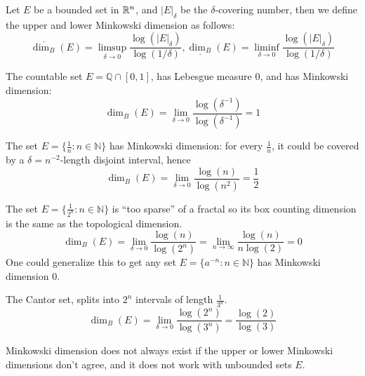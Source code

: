 \begin{definition}
    Let $E$ be a bounded set in $\mathbb{R}^n$, and $|E|_\delta$ be the $\delta$-covering number, then we define the upper and lower Minkowski dimension as follows:
    \begin{equation*}
        \overline{\dim_B}(E)=\limsup_{\delta\to 0}\frac{\log(|E|_\delta)}{\log(1/\delta)}, \underline{\dim_B}(E)=\liminf_{\delta\to 0}\frac{\log(|E|_\delta)}{\log(1/\delta)}
    \end{equation*}

\end{definition}
\begin{example}\label{exampleQ}
    The countable set $E=\mathbb{Q}
    \cap[0,1]$, has Lebesgue measure 0, and has Minkowski dimension:
    \begin{equation*}
        \dim_B(E)=\lim_{\delta\to 0}\frac{\log(\delta^{-1})}{\log(\delta^{-1})}=1
    \end{equation*}
\end{example}
\begin{example}
    The set $E=\{\frac{1}{n}:n\in\mathbb{N}\}$ has Minkowski dimension: for every $\frac{1}{n}$, it could be covered by a $\delta=n^{-2}$-length disjoint interval, hence
    \begin{equation*}
        \dim_B(E)=\lim_{\delta\to 0}\frac{\log(n)}{\log(n^2)}=\frac{1}{2}
    \end{equation*}
\end{example}
\begin{example}
    The set $E=\{\frac{1}{2^n}: n\in\mathbb{N}\}$ is ``too sparse'' of a fractal so its box counting dimension is the same as the topological dimension.
    \begin{equation*}
        \dim_B(E)=\lim_{\delta\to 0}\frac{\log(n)}{\log(2^n)}=\lim_{n\to\infty}\frac{\log(n)}{n\log(2)}=0
    \end{equation*}
    One could generalize this to get any set $E=\{a^{-n}: n\in\mathbb{N}\}$ has Minkowski dimension 0.
\end{example}
\begin{example}
    The Cantor set, splits into $2^n$ intervals of length $\frac{1}{3^n}$.
    \begin{equation*}
        \dim_B(E)=\lim_{\delta\to0}\frac{\log(2^n)}{\log(3^n)}=\frac{\log(2)}{\log(3)}
    \end{equation*}
\end{example}
\begin{note}
    Minkowski dimension does not always exist if the upper or lower Minkowski dimensions don't agree, and it does not work with unbounded sets $E$.
\end{note}

